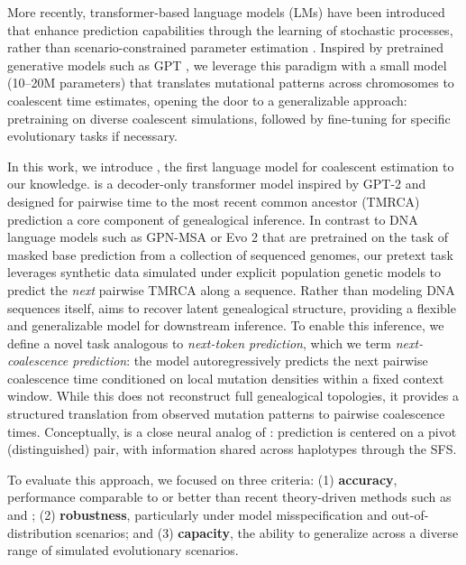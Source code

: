 \documentclass[9pt,twocolumn,twoside]{pnas-new}
\begin{document}
More recently, transformer-based language models (LMs) have been introduced
that enhance prediction capabilities through the learning of stochastic processes,
rather than scenario-constrained parameter estimation \cite{nait_saada_inference_2023}.
Inspired by pretrained generative models such as GPT \cite{Radford2018ImprovingLU},
we leverage this paradigm with a small model (10--20M parameters) that translates
mutational patterns across chromosomes to coalescent time estimates,
opening the door to a generalizable approach: pretraining on diverse coalescent simulations,
followed by fine-tuning for specific evolutionary tasks if necessary.

In this work, we introduce \cxtkit, the first language model for coalescent estimation to our knowledge. \cxtkit is a decoder-only transformer model inspired by GPT-2 and designed for pairwise time to the most recent common ancestor (TMRCA) prediction \textemdash a core component of genealogical inference. 
In contrast to DNA language models such as GPN-MSA or Evo 2  \cite{benegas2025dna, brixi2025genome} 
that are pretrained on the task of masked base prediction from a collection of sequenced genomes, 
our pretext task leverages synthetic data simulated under explicit population genetic models to predict the \emph{next} pairwise TMRCA along a sequence. 
Rather than modeling DNA sequences itself, \cxtkit aims to recover latent genealogical structure, providing a flexible and generalizable model for downstream inference. 
To enable this inference, we define a novel task analogous to \textit{next-token prediction},
which we term \textit{next-coalescence prediction}: the model autoregressively predicts
the next pairwise coalescence time conditioned on local mutation densities within a fixed
context window. While this does not reconstruct full genealogical topologies, it provides
a structured translation from observed mutation patterns to pairwise coalescence times.
Conceptually, \cxtkit is a close neural analog of \smcpp: prediction is centered on a
pivot (distinguished) pair, with information shared across haplotypes through the SFS.

To evaluate this approach, we focused on three criteria:
(1) \textbf{accuracy}, performance comparable to or better than recent theory-driven methods such as \singer and \smcpp;
(2) \textbf{robustness}, particularly under model misspecification and out-of-distribution scenarios; and
(3) \textbf{capacity}, the ability to generalize across a diverse range of simulated evolutionary scenarios.
\end{document}
